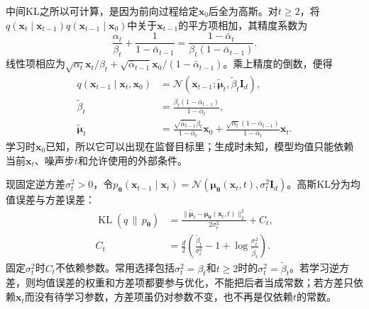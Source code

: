 中间KL之所以可计算，是因为前向过程给定$\bm{x}_0$后全为高斯。对$t\geq2$，将$q(\bm{x}_t\mid\bm{x}_{t-1})q(\bm{x}_{t-1}\mid\bm{x}_0)$中关于$\bm{x}_{t-1}$的平方项相加，其精度系数为
\[
  \frac{\alpha_t}{\beta_t}
    +\frac{1}{1-\bar{\alpha}_{t-1}}
  =\frac{1-\bar{\alpha}_t}
          {\beta_t(1-\bar{\alpha}_{t-1})}.
\]
线性项相应为$\sqrt{\alpha_t}\bm{x}_t/\beta_t+\sqrt{\bar{\alpha}_{t-1}}\bm{x}_0/(1-\bar{\alpha}_{t-1})$。乘上精度的倒数，便得
\begin{equation}
  \label{eq:pgm-generative-forward-posterior}
  \begin{aligned}
    q(\bm{x}_{t-1}\mid\bm{x}_t,\bm{x}_0)
      &=\mathcal{N}(\bm{x}_{t-1};
          \widetilde{\bm{\mu}}_t,\widetilde{\beta}_t\bm{I}_d),\\
    \widetilde{\beta}_t
      &=\frac{\beta_t(1-\bar{\alpha}_{t-1})}
              {1-\bar{\alpha}_t},\\
    \widetilde{\bm{\mu}}_t
      &=\frac{\sqrt{\bar{\alpha}_{t-1}}\beta_t}
               {1-\bar{\alpha}_t}\bm{x}_0
       +\frac{\sqrt{\alpha_t}(1-\bar{\alpha}_{t-1})}
               {1-\bar{\alpha}_t}\bm{x}_t.
  \end{aligned}
\end{equation}
学习时$\bm{x}_0$已知，所以它可以出现在监督目标里；生成时未知，模型均值只能依赖当前$\bm{x}_t$、噪声步$t$和允许使用的外部条件。

现固定逆方差$\sigma_t^2>0$，令$p_{\bm{\theta}}(\bm{x}_{t-1}\mid\bm{x}_t)=\mathcal{N}(\bm{\mu}_{\bm{\theta}}(\bm{x}_t,t),\sigma_t^2\bm{I}_d)$。高斯KL分为均值误差与方差误差：
\begin{equation}
  \label{eq:pgm-generative-gaussian-step-kl}
  \begin{aligned}
    \operatorname{KL}(q\,\|\,p_{\bm{\theta}})
      &=\frac{\lVert\widetilde{\bm{\mu}}_t
                    -\bm{\mu}_{\bm{\theta}}(\bm{x}_t,t)\rVert_2^2}
               {2\sigma_t^2}+C_t,\\
    C_t&=\frac{d}{2}
       \left(\frac{\widetilde{\beta}_t}{\sigma_t^2}
              -1+\log\frac{\sigma_t^2}{\widetilde{\beta}_t}\right).
  \end{aligned}
\end{equation}
固定$\sigma_t^2$时$C_t$不依赖参数。常用选择包括$\sigma_t^2=\beta_t$和$t\geq2$时的$\sigma_t^2=\widetilde{\beta}_t$。若学习逆方差，则均值误差的权重和方差项都要参与优化，不能把后者当成常数；若方差只依赖$\bm{x}_t$而没有待学习参数，方差项虽仍对参数不变，也不再是仅依赖$t$的常数。

